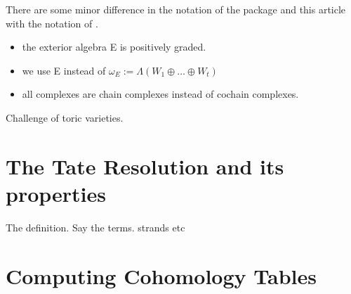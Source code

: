 \documentclass[twoside,12pt, leqno]{amsart}
\begin{document}
There are some minor difference in the notation of the package and this article with the notation of \cite{EES}.
\begin{itemize}
\item the exterior algebra E is positively graded.
\item we use E instead of $\omega_E:=\Lambda(W_1 \oplus \ldots \oplus W_t)$
\item all complexes are chain complexes instead of cochain complexes.
\end{itemize}

Challenge of toric varieties.

\section{The Tate Resolution and its properties}\label{TateRes}

The definition.  Say the terms.
strands etc

\section{Computing Cohomology Tables}
\end{document}
